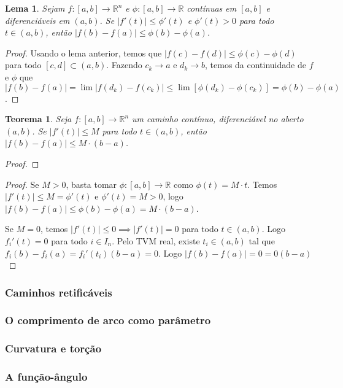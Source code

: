 \documentclass{article}
\theoremstyle{theorem}
\newtheorem{teo}{Teorema}
\theoremstyle{lemma}
\newtheorem{lema}{Lema}
\theoremstyle{definition}
\theoremstyle{remark}
\begin{document}
   \begin{lema}
	   Sejam \(f:[a,b] \to \mathbb{R}^n\) e \(\phi: [a,b] \to \mathbb{R}\) contínuas em \([a,b]\) e diferenciáveis em \( (a,b) \). Se \(|f'(t)  | \leq \phi'(t) \) e \(\phi'(t) > 0 \) para todo \( t\in (a,b) \), então \( |f(b) - f(a) | \leq \phi(b) - \phi(a) \).
   \end{lema}
   \begin{proof}
	   Usando o lema anterior, temos que \( |f(c) - f(d)| \leq \phi(c) - \phi(d)\) para todo \([c,d] \subset (a,b)\). Fazendo \(c_k\to a\) e \(d_k\to b\), temos da continuidade de \(f\) e \(\phi\) que \(|f(b) - f(a)| = \lim |f(d_k) - f(c_k)| \leq \lim [ \phi(d_k) - \phi(c_k) ] = \phi(b) - \phi(a) \).

   \end{proof}
   \begin{teo}
	   Seja \(f:[a,b] \to \mathbb{R}^n\) um caminho contínuo, diferenciável no aberto \( (a,b) \). Se \( |f'(t)| \leq M\) para todo \( t\in (a,b) \), então \( |f(b) - f(a)| \leq M \cdot (b-a) \).
   \end{teo}
   \begin{proof}
	   
   \end{proof}
   \begin{proof}
	   Se \(M>0\), basta tomar \(\phi:[a,b] \to \mathbb{R}\) como \(\phi(t) = M\cdot t\). Temos \( |f'(t)| \leq  M = \phi'(t) \) e \(\phi'(t) = M >0\), logo \(|f(b) - f(a) | \leq \phi(b) - \phi(a) = M\cdot(b-a)\). 
	   
	   Se \( M  = 0 \), temos \(|f'(t)| \leq 0 \implies |f'(t)| = 0\) para todo \(t\in (a,b)\). Logo \(f_i'(t) = 0\) para todo \( i \in I_n\). Pelo TVM real, existe \(t_i \in (a,b)\) tal  que \( f_i(b) - f_i(a) = f_i'(t_i)(b - a) = 0 \). Logo  \( |f(b) - f(a)| =   0 = 0 (b-a)\)
   \end{proof}
   \subsubsection{ Caminhos retificáveis}
   \subsubsection{ O comprimento de arco como parâmetro}
   \subsubsection{ Curvatura e torção}
   \subsubsection{ A função-ângulo}
\end{document}
